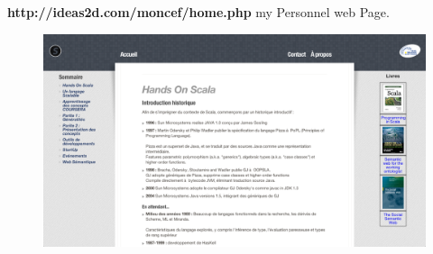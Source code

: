 \newpage
\textbf{http://ideas2d.com/moncef/home.php} my Personnel web Page.
\begin{figure}[H]
        \centering
                \centering
                \includegraphics[width=\textwidth]{idea2d.png}
               
\end{figure}